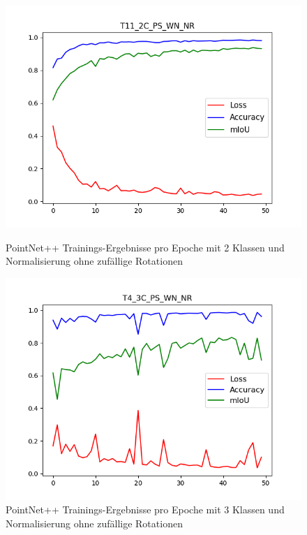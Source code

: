 \documentclass[12pt,titlepage, twoside]{article}
\begin{document}
\begin{figure}
    \centering
    \begin{minipage}{0.475\textwidth}
        \centering
        \includegraphics[width=1.0\textwidth]{./Images/T11_2C_PS_WN_NR.png}
        \caption{PointNet++ Trainings-Ergebnisse pro Epoche mit 2 Klassen und Normalisierung ohne zufällige Rotationen}
        \label{fig:T11_2C_PS_WN_NR}
    \end{minipage}\hfill
    \begin{minipage}{0.475\textwidth}
        \centering
        \includegraphics[width=1.0\textwidth]{./Images/T4_3C_PS_WN_NR.png}
        \caption{PointNet++ Trainings-Ergebnisse pro Epoche mit 3 Klassen und Normalisierung ohne zufällige Rotationen}
        \label{fig:T4_3C_PS_WN_NR}
    \end{minipage}
\end{figure}
\end{document}
